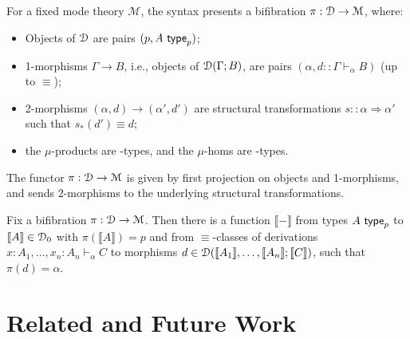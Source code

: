 \documentclass[a4paper,USenglish,numberwithinsect]{lipics-v2016}
\newcommand\deq{\ensuremath{\equiv}}
\newcommand\spr{\ensuremath{\Rightarrow}} %
\newcommand\seq[3]{\ensuremath{#1 \vdash_{#2} #3}}
\newcommand\Fsymb[0]{\dsd{F}}
\newcommand\Usymb[0]{\dsd{U}}
\newcommand\wftype[2]{\ensuremath{#1 \,\, \dsd{type}_{#2}}}
\def\M{\mathcal{M}}
\def\llb{\llbracket}
\def\rrb{\rrbracket}
\newcommand\Trd[2]{\ensuremath{#1_*(#2)}}
\begin{document}
\begin{theorem} \label{thm:completeness}
For a fixed mode theory $\M$, the syntax presents a bifibration $\pi : \cD \to \M$, where:
\begin{itemize}
\item Objects of $\mathcal{D}$ are pairs $(p, \wftype{A}{p})$;
\item 1-morphisms $\Gamma \to B$, i.e., objects of $\mathcal{D}(\Gamma; B)$, are pairs $(\alpha, d :: \seq{\Gamma}{\alpha}{B})$ (up to \deq); 
\item 2-morphisms $(\alpha, d) \to (\alpha', d')$ are structural
  transformations $s :: \alpha \spr \alpha'$ such that $\Trd{s}{d'} \deq d$;
\item the $\mu$-products are \Fsymb-types, and the $\mu$-homs are \Usymb-types.
\end{itemize}
The functor $\pi : \cD \to \M$ is given by first projection on objects and 1-morphisms, and sends 2-morphisms to the underlying structural transformations.
\end{theorem}

\begin{theorem} \label{thm:soundness}
Fix a bifibration $\pi : \cD \to \M$.  Then there is a function $\llb -
\rrb$ from types \wftype{A}{p} to $\llb A \rrb \in \cD_0$ with $\pi(\llb
A \rrb) = p$ and from $\deq$-classes of derivations $\seq{x:A_1, \ldots,
  x_n:A_n}{\alpha}{C}$ to morphisms $d \in \cD(\llb A_1 \rrb, \dots, \llb
A_n \rrb; \llb C \rrb)$, such that $\pi(d) = \alpha$.
\end{theorem}


\section{Related and Future Work}
\end{document}
